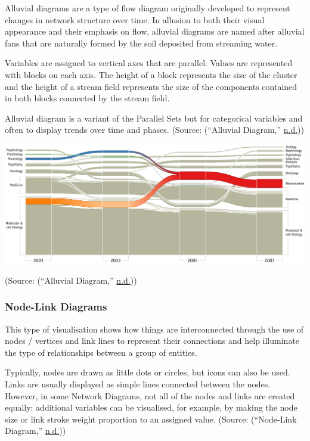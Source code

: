\documentclass[]{book}
\begin{document}
Alluvial diagrams are a type of flow diagram originally developed to represent changes in network structure over time. In allusion to both their visual appearance and their emphasis on flow, alluvial diagrams are named after alluvial fans that are naturally formed by the soil deposited from streaming water.

Variables are assigned to vertical axes that are parallel. Values are represented with blocks on each axis. The height of a block represents the size of the cluster and the height of a stream field represents the size of the components contained in both blocks connected by the stream field.

Alluvial diagram is a variant of the Parallel Sets but for categorical variables and often to display trends over time and phases.
(Source: (``Alluvial Diagram,'' \protect\hyperlink{ref-alluvial}{n.d.}))

\includegraphics{images/alluvial-diag.png}

(Source: (``Alluvial Diagram,'' \protect\hyperlink{ref-alluvial-diag}{n.d.}))

\hypertarget{node-link-diagrams}{%
\subsubsection{Node-Link Diagrams}\label{node-link-diagrams}}

This type of visualisation shows how things are interconnected through the use of nodes / vertices and link lines to represent their connections and help illuminate the type of relationships between a group of entities.

Typically, nodes are drawn as little dots or circles, but icons can also be used. Links are usually displayed as simple lines connected between the nodes. However, in some Network Diagrams, not all of the nodes and links are created equally: additional variables can be visualised, for example, by making the node size or link stroke weight proportion to an assigned value.
(Source: (``Node-Link Diagram,'' \protect\hyperlink{ref-node-link}{n.d.}))
\end{document}
